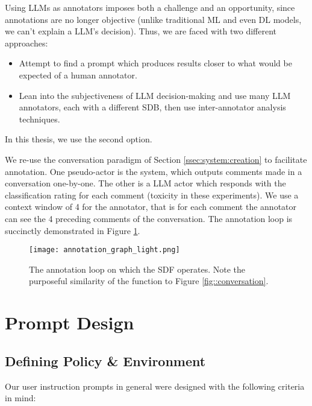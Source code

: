 Using LLMs as annotators imposes both a challenge and an opportunity, since annotations are no longer objective (unlike traditional ML and even DL models, we can't explain a LLM's decision). Thus, we are faced with two different approaches:

\begin{itemize}
	\item Attempt to find a prompt which produces results closer to what would be expected of a human annotator.
	\item Lean into the subjectiveness of LLM decision-making and use many LLM annotators, each with a different SDB, then use inter-annotator analysis techniques.
\end{itemize}

In this thesis, we use the second option.

We re-use the conversation paradigm of Section \ref{ssec:system:creation} to facilitate annotation. One pseudo-actor is the system, which outputs comments made in a conversation one-by-one. The other is a LLM actor which responds with the classification rating for each comment (toxicity in these experiments).  We use a context window of 4 for the annotator, that is for each comment the annotator can see the 4 preceding comments of the conversation. The annotation loop is succinctly demonstrated in Figure \ref{fig::annotation}.

\begin{figure}
	\centering
	\texttt{[image: annotation\_graph\_light.png]}
	\caption{The annotation loop on which the SDF operates. Note the purposeful similarity of the function to Figure \ref{fig::conversation}.}
	\label{fig::annotation}
\end{figure}


\section{Prompt Design}
\label{sec:system:design-prompt}

\subsection{Defining Policy \& Environment}

Our user instruction prompts in general were designed with the following criteria in mind:

